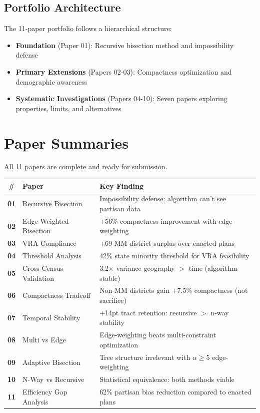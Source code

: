 \documentclass[11pt]{article}
\begin{document}
\subsection*{Portfolio Architecture}

The 11-paper portfolio follows a hierarchical structure:
\begin{itemize}[leftmargin=*,noitemsep,topsep=4pt]
    \item \textbf{Foundation} (Paper 01): Recursive bisection method and impossibility defense
    \item \textbf{Primary Extensions} (Papers 02-03): Compactness optimization and demographic awareness
    \item \textbf{Systematic Investigations} (Papers 04-10): Seven papers exploring properties, limits, and alternatives
\end{itemize}

\section*{Paper Summaries}

All 11 papers are complete and ready for submission.

\vspace{6pt}

{\small
\begin{tabular}{@{}clp{8cm}@{}}
\toprule
\textbf{\#} & \textbf{Paper} & \textbf{Key Finding} \\
\midrule
\textbf{01} & Recursive Bisection & Impossibility defense: algorithm can't see partisan data \\
\textbf{02} & Edge-Weighted Bisection & +56\% compactness improvement with edge-weighting \\
\textbf{03} & VRA Compliance & +69 MM district surplus over enacted plans \\
\textbf{04} & Threshold Analysis & 42\% state minority threshold for VRA feasibility \\
\textbf{05} & Cross-Census Validation & 3.2× variance geography $>$ time (algorithm stable) \\
\textbf{06} & Compactness Tradeoff & Non-MM districts gain +7.5\% compactness (not sacrifice) \\
\textbf{07} & Temporal Stability & +14pt tract retention: recursive $>$ n-way stability \\
\textbf{08} & Multi vs Edge & Edge-weighting beats multi-constraint optimization \\
\textbf{09} & Adaptive Bisection & Tree structure irrelevant with $\alpha \geq 5$ edge-weighting \\
\textbf{10} & N-Way vs Recursive & Statistical equivalence: both methods viable \\
\textbf{11} & Efficiency Gap Analysis & 62\% partisan bias reduction compared to enacted plans \\
\bottomrule
\end{tabular}
}
\end{document}
